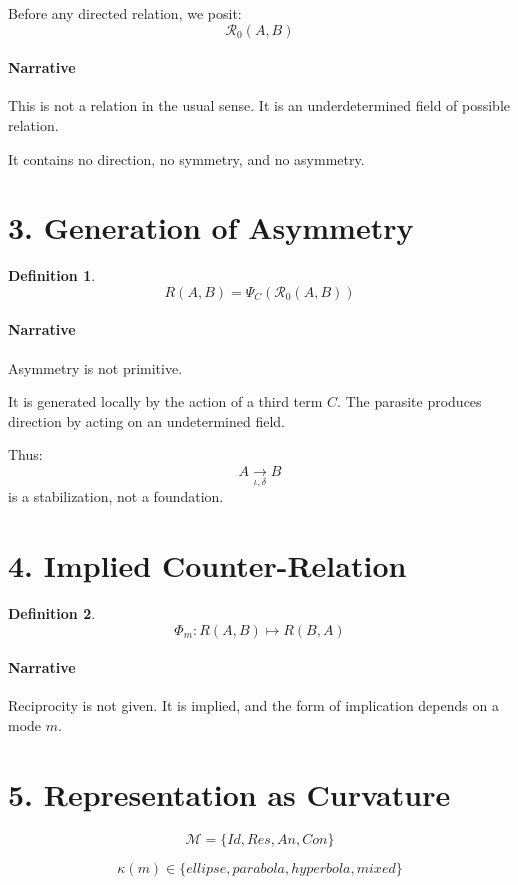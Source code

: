 \documentclass[11pt]{article}
\newtheorem{definition}{Definition}
\begin{document}
Before any directed relation, we posit:
\[
\mathcal{R}_0(A,B)
\]

\paragraph{Narrative}
This is not a relation in the usual sense.
It is an underdetermined field of possible relation.

It contains no direction, no symmetry, and no asymmetry.

\section{3. Generation of Asymmetry}

\begin{definition}
\[
R(A,B) = \Psi_C(\mathcal{R}_0(A,B))
\]
\end{definition}

\paragraph{Narrative}
Asymmetry is not primitive.

It is generated locally by the action of a third term $C$.
The parasite produces direction by acting on an undetermined field.

Thus:
\[
A \xrightarrow[\iota,\delta]{} B
\]
is a stabilization, not a foundation.

\section{4. Implied Counter-Relation}

\begin{definition}
\[
\Phi_m : R(A,B) \mapsto R(B,A)
\]
\end{definition}

\paragraph{Narrative}
Reciprocity is not given.
It is implied, and the form of implication depends on a mode $m$.

\section{5. Representation as Curvature}

\[
\mathcal{M} = \{Id, Res, An, Con\}
\]

\[
\kappa(m) \in \{ellipse, parabola, hyperbola, mixed\}
\]
\end{document}
